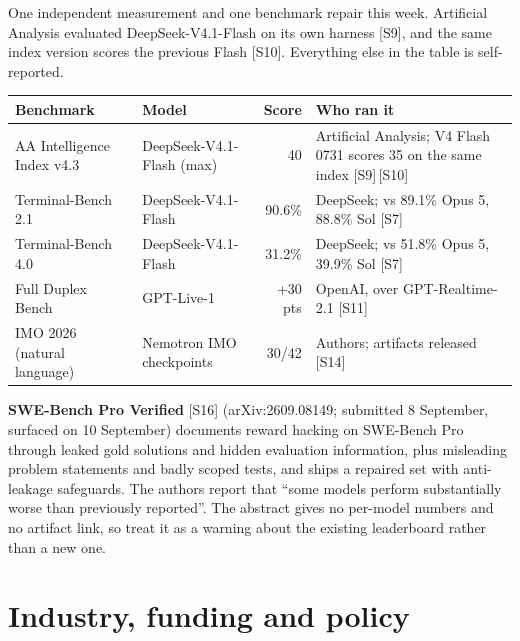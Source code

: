 \documentclass[11pt,a4paper]{article}
\newcommand{\srcref}[1]{\textcolor{brandaccent}{[S#1]}}
\begin{document}
One independent measurement and one benchmark repair this week. Artificial Analysis
evaluated DeepSeek-V4.1-Flash on its own harness \srcref{9}, and the same index version
scores the previous Flash \srcref{10}. Everything else in the table is self-reported.

{\footnotesize
\begin{tabularx}{\textwidth}{@{}l l r X@{}}
\toprule
\textbf{Benchmark} & \textbf{Model} & \textbf{Score} & \textbf{Who ran it} \\
\midrule
AA Intelligence Index v4.3 & DeepSeek-V4.1-Flash (max) & 40 & Artificial Analysis; V4 Flash 0731 scores 35 on the same index \srcref{9}\,\srcref{10} \\
Terminal-Bench 2.1        & DeepSeek-V4.1-Flash & 90.6\% & DeepSeek; vs 89.1\% Opus 5, 88.8\% Sol \srcref{7} \\
Terminal-Bench 4.0        & DeepSeek-V4.1-Flash & 31.2\% & DeepSeek; vs 51.8\% Opus 5, 39.9\% Sol \srcref{7} \\
Full Duplex Bench         & GPT-Live-1 & +30 pts & OpenAI, over GPT-Realtime-2.1 \srcref{11} \\
IMO 2026 (natural language) & Nemotron IMO checkpoints & 30/42 & Authors; artifacts released \srcref{14} \\
\bottomrule
\end{tabularx}}
\vspace{0.4em}

\textbf{SWE-Bench Pro Verified} \srcref{16} (arXiv:2609.08149; submitted 8 September,
surfaced on 10 September) documents reward hacking on SWE-Bench Pro through leaked gold
solutions and hidden evaluation information, plus misleading problem statements and
badly scoped tests, and ships a repaired set with anti-leakage safeguards. The authors
report that ``some models perform substantially worse than previously reported''. The
abstract gives no per-model numbers and no artifact link, so treat it as a warning about the
existing leaderboard rather than a new one.

\section{Industry, funding and policy}
\end{document}

